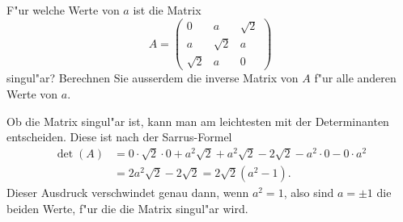 F"ur welche Werte von $a$ ist die Matrix 
\[
A=\begin{pmatrix}
0&a&\sqrt{2}\\
a&\sqrt{2}&a\\
\sqrt{2}&a&0
\end{pmatrix}
\]
singul"ar?
Berechnen Sie ausserdem die inverse Matrix von $A$ f"ur alle anderen
Werte von $a$.

\begin{loesung}
Ob die Matrix singul"ar ist, kann man am leichtesten mit der Determinanten
entscheiden. 
Diese ist nach der Sarrus-Formel
\begin{align*}
\det(A)
&=
0\cdot \sqrt{2}\cdot 0+a^2\sqrt{2}+a^2\sqrt{2}-2\sqrt{2}-a^2\cdot 0 - 0\cdot a^2
\\
&=2a^2\sqrt{2}-2\sqrt{2}=2\sqrt{2}(a^2-1).
\end{align*}
Dieser Ausdruck verschwindet genau dann, wenn $a^2=1$,
also sind $a=\pm1$ die beiden Werte, f"ur die die Matrix singul"ar wird.


\end{loesung}

